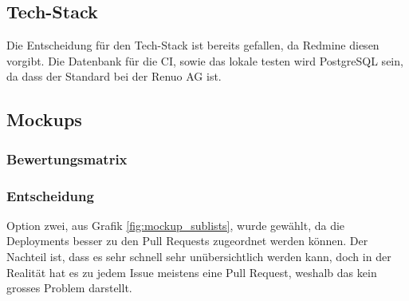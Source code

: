 \begin{minipage}{\textwidth}
    \subsection{Tech-Stack}
    Die Entscheidung für den Tech-Stack ist bereits gefallen, da Redmine diesen vorgibt. \newline
    Die Datenbank für die CI, sowie das lokale testen wird PostgreSQL sein, da dass der Standard bei der Renuo AG ist.
    \newline
\end{minipage}

\begin{minipage}{\textwidth}
    \subsection{Mockups}
    \subsubsection{Bewertungsmatrix}
    \begin{center}
    \end{center}

    \subsubsection{Entscheidung}
    Option zwei, aus Grafik \ref{fig:mockup_sublists}, wurde gewählt, da die Deployments besser zu den Pull Requests
    zugeordnet werden können. Der Nachteil ist, dass es sehr schnell sehr unübersichtlich werden kann, doch in der Realität
    hat es zu jedem Issue meistens eine Pull Request, weshalb das kein grosses Problem darstellt.
\end{minipage}

